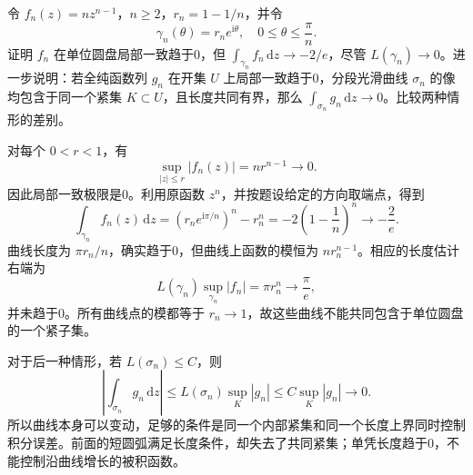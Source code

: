 \begin{exercise}\label{b3:ex:04-2}
令 \(f_n(z)=nz^{n-1}\)，\(n\ge2\)，\(r_n=1-1/n\)，并令
\[
 \gamma_n(\theta)=r_ne^{\mathrm{i}\theta},
 \quad 0\le\theta\le\frac{\pi}{n}.
\]
证明 \(f_n\) 在单位圆盘局部一致趋于0，但
\(\int_{\gamma_n}f_n\,\mathrm{d}z\to-2/e\)，尽管 \(L(\gamma_n)\to0\)。进一步说明：若全纯函数列 \(g_n\) 在开集 \(U\) 上局部一致趋于0，分段光滑曲线 \(\sigma_n\) 的像均包含于同一个紧集 \(K\subset U\)，且长度共同有界，那么 \(\int_{\sigma_n}g_n\,\mathrm{d}z\to0\)。比较两种情形的差别。
\end{exercise}
\begin{solution}
对每个 \(0<r<1\)，有
\[
 \sup_{|z|\le r}|f_n(z)|=nr^{n-1}\longrightarrow0.
\]
因此局部一致极限是0。利用原函数 \(z^n\)，并按题设给定的方向取端点，得到
\[
 \int_{\gamma_n}f_n(z)\,\mathrm{d}z
 =\left(r_ne^{\mathrm{i}\pi/n}\right)^n-r_n^n
 =-2\left(1-\frac1n\right)^n
 \longrightarrow-\frac2e.
\]
曲线长度为 \(\pi r_n/n\)，确实趋于0，但曲线上函数的模恒为 \(nr_n^{n-1}\)。相应的长度估计右端为
\[
 L(\gamma_n)\sup_{\gamma_n}|f_n|
 =\pi r_n^n\longrightarrow\frac{\pi}{e},
\]
并未趋于0。所有曲线点的模都等于 \(r_n\to1\)，故这些曲线不能共同包含于单位圆盘的一个紧子集。

对于后一种情形，若 \(L(\sigma_n)\le C\)，则
\[
 \left|\int_{\sigma_n}g_n\,\mathrm{d}z\right|
 \le L(\sigma_n)\sup_K|g_n|
 \le C\sup_K|g_n|\longrightarrow0.
\]
所以曲线本身可以变动，足够的条件是同一个内部紧集和同一个长度上界同时控制积分误差。前面的短圆弧满足长度条件，却失去了共同紧集；单凭长度趋于0，不能控制沿曲线增长的被积函数。
\end{solution}


